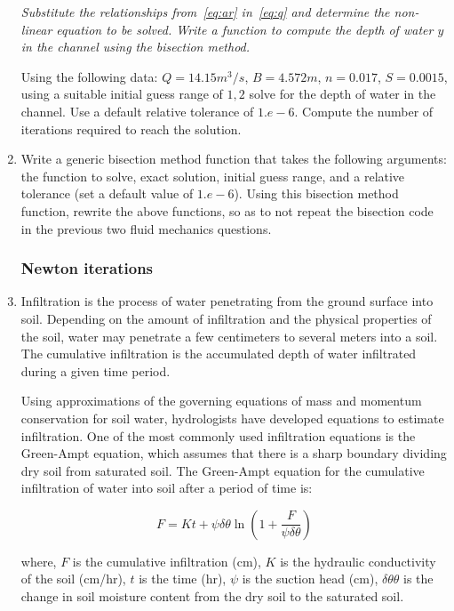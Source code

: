 \documentclass[a4paper,12pt]{article}
\begin{document}
\begin{enumerate}
	\textit{Substitute the relationships from~\cref{eq:ar} in~\cref{eq:q} and determine the non-linear equation to be solved. Write a function to compute the depth of water $y$ in the channel using the bisection method.}
	
	Using the following data: $Q = 14.15 m^3/s$, $B=4.572m$, $n = 0.017$, $S=0.0015$, using a suitable initial guess range of $1, 2$ solve for the depth of water in the channel. Use a default relative tolerance of $1.e-6$. Compute the number of iterations required to reach the solution.
	
	\item Write a generic bisection method function that takes the following arguments: the function to solve, exact solution, initial guess range, and a relative tolerance (set a default value of $1.e-6$). Using this bisection method function, rewrite the above functions, so as to not repeat the bisection code in the previous two fluid mechanics questions.
	
	\subsubsection*{Newton iterations}
	
	\item Infiltration is the process of water penetrating from the ground surface into soil. Depending on the amount of infiltration and the physical properties of the soil, water may penetrate a few centimeters to several meters into a soil. The cumulative infiltration is the accumulated depth of water infiltrated during a given time period.
	
	Using approximations of the governing equations of mass and momentum conservation for soil water, hydrologists have developed equations to estimate infiltration. One of the most commonly used infiltration equations is the Green-Ampt equation, which assumes that there is a
	sharp boundary dividing dry soil from saturated soil. The Green-Ampt equation for the cumulative infiltration of water into soil after a period of time is:
	
	\begin{equation}
		F = K t + \psi \delta\theta\ln\left(1 + \frac{F}{\psi\delta\theta}\right)
	\end{equation}
	
	where, 
	$F$ is the cumulative infiltration (cm), $K$ is the hydraulic conductivity of the soil (cm/hr), $t$ is the time (hr), $\psi$ is the suction head (cm), $\delta\theta\theta$ is the change in soil moisture content from the dry soil to the saturated soil. 
	

\end{enumerate}
\end{document}
